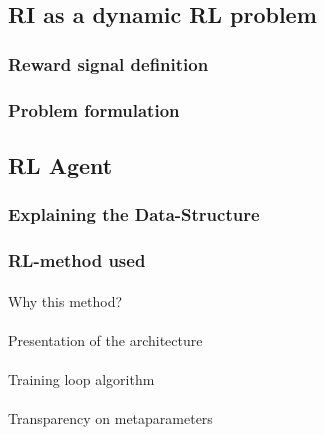 \documentclass[
  12pt,
]{article}
\makeatletter
\let\oldparagraph\paragraph
\renewcommand{\paragraph}{
    \@ifstar
      \xxxParagraphStar
      \xxxParagraphNoStar
  }
\newcommand{\xxxParagraphStar}[1]{\oldparagraph*{#1}\mbox{}}
\newcommand{\xxxParagraphNoStar}[1]{\oldparagraph{#1}\mbox{}}
\makeatother
\begin{document}
\subsection{RI as a dynamic RL
problem}\label{ri-as-a-dynamic-rl-problem}

\subsubsection{Reward signal definition}\label{reward-signal-definition}

\subsubsection{Problem formulation}\label{problem-formulation}

\subsection{RL Agent}\label{rl-agent}

\subsubsection{Explaining the
Data-Structure}\label{explaining-the-data-structure}

\subsubsection{RL-method used}\label{rl-method-used}

\paragraph{Why this method?}\label{why-this-method}

\paragraph{Presentation of the
architecture}\label{presentation-of-the-architecture}

\paragraph{Training loop algorithm}\label{training-loop-algorithm}

\paragraph{Transparency on
metaparameters}\label{transparency-on-metaparameters}
\end{document}
